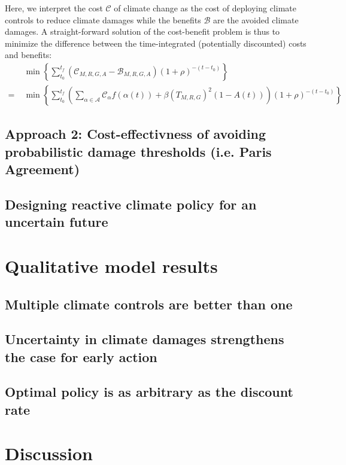 \documentclass{article}
\begin{document}
Here, we interpret the cost $\mathcal{C}$ of climate change as the cost of deploying climate controls to reduce climate damages while the benefits $\mathcal{B}$ are the avoided climate damages. A straight-forward solution of the cost-benefit problem is thus to minimize the difference between the time-integrated (potentially discounted) costs and benefits:
\begin{align}
    &\min \left\{ \sum_{t_{0}}^{t_{f}} 
    \left(\mathcal{C}_{M, R, G, A} - \mathcal{B}_{M, R, G, A}\right) (1 + \rho)^{-(t-t_{0})} \right\} \\
    = \; & \min \left\{ \sum_{t_{0}}^{t_{f}} \left( \sum_{\alpha \in \mathcal{A}} \mathcal{C}_{\alpha} f(\alpha(t)) + \beta (T_{M, R, G})^{2}(1-A(t)) \right) (1 + \rho)^{-(t-t_{0})} \right\}
\end{align}

\subsection{Approach 2: Cost-effectivness of avoiding probabilistic damage thresholds (i.e. Paris Agreement)}\label{sec.paris_goal}

\subsection{Designing reactive climate policy for an uncertain future}

\section{Qualitative model results}

\subsection{Multiple climate controls are better than one}

\subsection{Uncertainty in climate damages strengthens the case for early action}

\subsection{Optimal policy is as arbitrary as the discount rate}

\section{Discussion}



%

\end{document}
